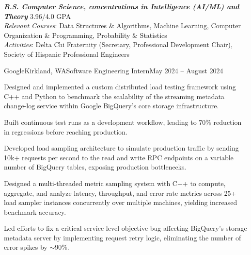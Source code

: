\documentclass{article}
\begin{document}
\thispagestyle{empty}


\begin{flushleft}


{\textbf{\textit{B.S. Computer Science, concentrations in Intelligence (AI/ML) and Theory}} \hfill 3.96/4.0 GPA \\ \textit{Relevant Courses}:
    Data Structures \& Algorithms,
    Machine Learning,
    Computer Organization \& Programming,
    Probability \& Statistics
    \\
    \textit{Activities}: Delta Chi Fraternity (Secretary, Professional Development Chair), Society of Hispanic Professional Engineers
}


    \begin{experience}{Google}{Kirkland, WA}{Software Engineering Intern}{May 2024 -- August 2024}
        \item Designed and implemented a custom distributed load testing framework using C++ and Python to benchmark the scalability of the streaming metadata change-log service within Google BigQuery's core storage infrastructure.
        \item Built continuous test runs as a development workflow, leading to 70\% reduction in regressions before reaching production.
        \item Developed load sampling architecture to simulate production traffic by sending 10k+ requests per second to the read and write RPC endpoints on a variable number of BigQuery tables, exposing production bottlenecks.
        \item Designed a multi-threaded metric sampling system with C++ to compute, aggregate, and analyze latency, throughput, and error rate metrics across 25+ load sampler instances concurrently over multiple machines, yielding increased benchmark accuracy.
        \item Led efforts to fix a critical service-level objective bug affecting BigQuery's storage metadata server by implementing request retry logic, eliminating the number of error spikes by $\sim$90\%.
    \end{experience}


\end{flushleft}
\end{document}
